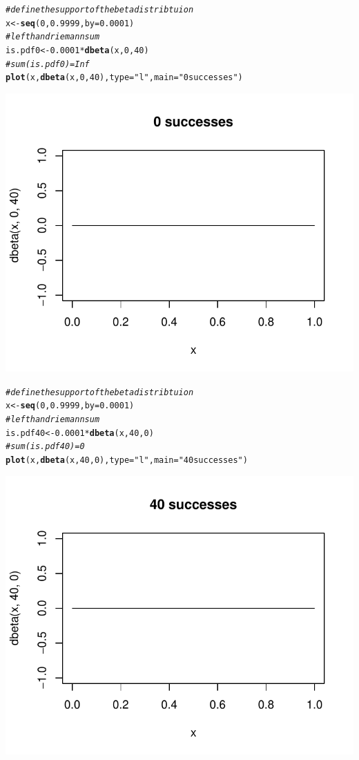 \documentclass[12pt]{article}\usepackage[]{graphicx}\usepackage[]{color}
\makeatletter
\newcommand{\hlnum}[1]{\textcolor[rgb]{0.686,0.059,0.569}{#1}}%
\newcommand{\hlstr}[1]{\textcolor[rgb]{0.192,0.494,0.8}{#1}}%
\newcommand{\hlcom}[1]{\textcolor[rgb]{0.678,0.584,0.686}{\textit{#1}}}%
\newcommand{\hlopt}[1]{\textcolor[rgb]{0,0,0}{#1}}%
\newcommand{\hlstd}[1]{\textcolor[rgb]{0.345,0.345,0.345}{#1}}%
\newcommand{\hlkwb}[1]{\textcolor[rgb]{0.69,0.353,0.396}{#1}}%
\newcommand{\hlkwc}[1]{\textcolor[rgb]{0.333,0.667,0.333}{#1}}%
\newcommand{\hlkwd}[1]{\textcolor[rgb]{0.737,0.353,0.396}{\textbf{#1}}}%
\newenvironment{kframe}{%
 \def\at@end@of@kframe{}%
 \ifinner\ifhmode%
  \def\at@end@of@kframe{\end{minipage}}%
  \begin{minipage}{\columnwidth}%
 \fi\fi%
 \def\FrameCommand##1{\hskip\@totalleftmargin \hskip-\fboxsep
 \colorbox{shadecolor}{##1}\hskip-\fboxsep
     \hskip-\linewidth \hskip-\@totalleftmargin \hskip\columnwidth}%
 \MakeFramed {\advance\hsize-\width
   \@totalleftmargin\z@ \linewidth\hsize
   \@setminipage}}%
 {\par\unskip\endMakeFramed%
 \at@end@of@kframe}
\newenvironment{knitrout}{}{} %
\makeatother
\begin{document}
\begin{doublespacing}
\begin{enumerate}
\begin{enumerate}
\begin{singlespace}
\begin{knitrout}\footnotesize
{}\color{fgcolor}\begin{kframe}
\begin{alltt}
\hlcom{#define the support of the beta distribtuion}
\hlstd{x} \hlkwb{<-} \hlkwd{seq}\hlstd{(}\hlnum{0}\hlstd{,} \hlnum{0.9999}\hlstd{,} \hlkwc{by}\hlstd{=}\hlnum{0.0001}\hlstd{)}
\hlcom{#left hand riemann sum}
\hlstd{is.pdf0} \hlkwb{<-} \hlnum{0.0001}\hlopt{*}\hlkwd{dbeta}\hlstd{(x,} \hlnum{0}\hlstd{,} \hlnum{40}\hlstd{)}
\hlcom{#sum(is.pdf0)=Inf}
\hlkwd{plot}\hlstd{(x,} \hlkwd{dbeta}\hlstd{(x,} \hlnum{0}\hlstd{,} \hlnum{40}\hlstd{),} \hlkwc{type}\hlstd{=}\hlstr{"l"}\hlstd{,} \hlkwc{main}\hlstd{=}\hlstr{"0 successes"}\hlstd{)}
\end{alltt}
\end{kframe}
\includegraphics[width=.5\linewidth]{figure/numint3-1} 
\begin{kframe}\begin{alltt}
\hlcom{#define the support of the beta distribtuion}
\hlstd{x} \hlkwb{<-} \hlkwd{seq}\hlstd{(}\hlnum{0}\hlstd{,} \hlnum{0.9999}\hlstd{,} \hlkwc{by}\hlstd{=}\hlnum{0.0001}\hlstd{)}
\hlcom{#left hand riemann sum}
\hlstd{is.pdf40} \hlkwb{<-} \hlnum{0.0001}\hlopt{*}\hlkwd{dbeta}\hlstd{(x,} \hlnum{40}\hlstd{,} \hlnum{0}\hlstd{)}
\hlcom{#sum(is.pdf40)=0}
\hlkwd{plot}\hlstd{(x,} \hlkwd{dbeta}\hlstd{(x,} \hlnum{40}\hlstd{,} \hlnum{0}\hlstd{),} \hlkwc{type}\hlstd{=}\hlstr{"l"}\hlstd{,} \hlkwc{main}\hlstd{=}\hlstr{"40 successes"}\hlstd{)}
\end{alltt}
\end{kframe}
\includegraphics[width=.5\linewidth]{figure/numint3-2} 


\end{knitrout}
\end{singlespace}
\end{enumerate}
\end{enumerate}
\end{doublespacing}
\end{document}
